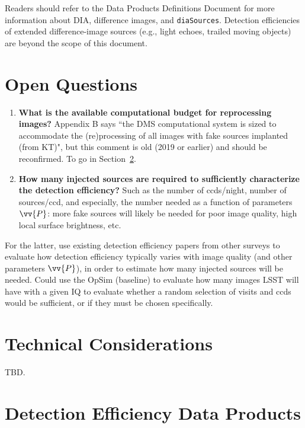 \documentclass[DM,authoryear,toc]{lsstdoc}
\begin{document}
Readers should refer to the Data Products Definitions Document  for more information about DIA, difference images, and {\tt diaSources}.
Detection efficiencies of extended difference-image sources (e.g., light echoes, trailed moving objects) are beyond the scope of this document.


\clearpage
\section{Open Questions}\label{sec:oq}

\begin{enumerate}
\item \textbf{What is the available computational budget for reprocessing images?} Appendix B says ``the DMS computational system is sized to accommodate the (re)processing of all images with fake sources implanted (from KT)", but this comment is old (2019 or earlier) and should be reconfirmed. To go in Section~\ref{sec:tech}.
\item \textbf{How many injected sources are required to sufficiently characterize the detection efficiency?} Such as the number of ccds/night, number of sources/ccd, and especially, the number needed as a function of parameters $\vv{P}$: more fake sources will likely be needed for poor image quality, high local surface brightness, etc.
\end{enumerate}

For the latter, use existing detection efficiency papers from other surveys to evaluate how detection efficiency typically varies with image quality (and other parameters $\vv{P}$), in order to estimate how many injected sources will be needed.
Could use the OpSim (baseline) to evaluate how many images LSST will have with a given IQ to evaluate whether a random selection of visits and ccds would be sufficient, or if they must be chosen specifically. 


\section{Technical Considerations}\label{sec:tech}

TBD.



\clearpage
\section{Detection Efficiency Data Products}\label{sec:dedp}
\end{document}
